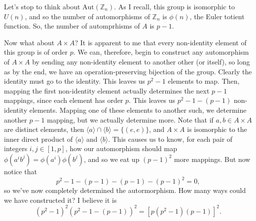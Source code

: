 \documentclass[12pt]{article}
\newcommand{\Z}{\mathbb{Z}}
\newcommand{\aut}{\mbox{Aut}}
\begin{document}
Let's stop to think about $\aut(\Z_n)$.  As I recall, this group is isomorphic to $U(n)$, and so the number of
automorphisms of $\Z_n$ is $\phi(n)$, the Euler totient function.  So, the number of automprhisms of $A$
is $p-1$.

Now what about $A\times A$?  It is apparent to me that every non-identity element of this group is
of order $p$.  We can, therefore, begin to construct any automorphism of $A\times A$ by sending
any non-identity element to another other (or itself), so long as by the end, we have an operation-preserving
bijection of the group.  Clearly the identity must go to the identity.  This leaves us $p^2-1$ elements to map.
Then, mapping the first non-identity element actually determines the next $p-1$ mappings, since each
element has order $p$.  This leaves us $p^2-1-(p-1)$ non-identity elements.  Mapping one of these
elements to another such, we determine another $p-1$ mapping, but we actually determine more.
Note that if $a,b\in A\times A$ are distinct elements, then $\langle a\rangle\cap\langle b\rangle=\{(e,e)\}$,
and $A\times A$ is isomorphic to the inner direct product of $\langle a\rangle$ and $\langle b\rangle$.  This causes us
to know, for each pair of integers $i,j\in[1,p]$, how our automorphism should map $\phi(a^ib^j)=\phi(a^i)\phi(b^j)$, and so we eat up
$(p-1)^2$ more mappings.  But now notice that
\begin{equation*}
p^2-1-(p-1)-(p-1)-(p-1)^2 = 0,
\end{equation*}
so we've now completely determined the autormorphism.  How many ways could we have constructed it?
I believe it is
\begin{equation*}
(p^2-1)^2(p^2-1-(p-1))^2 = [p(p^2-1)(p-1)]^2.
\end{equation*}
\end{document}
